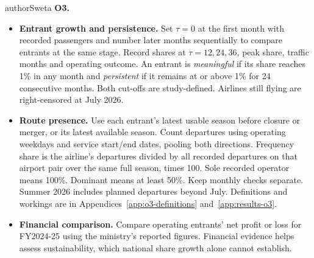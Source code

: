 \begin{authorcontribution}{authorSweta}
\label{sec:method-o3}
\textbf{O3.}
\begin{itemize}[leftmargin=2em]
    \item \textbf{Entrant growth and persistence.} Set $\tau=0$ at the first month with recorded passengers and number later months sequentially to compare entrants at the same stage. Record shares at $\tau=12,24,36$, peak share, traffic months and operating outcome. An entrant is \emph{meaningful} if its share reaches 1\% in any month and \emph{persistent} if it remains at or above 1\% for 24 consecutive months. Both cut-offs are study-defined. Airlines still flying are right-censored at July 2026.
    \item \textbf{Route presence.} Use each entrant's latest usable season before closure or merger, or its latest available season. Count departures using operating weekdays and service start/end dates, pooling both directions. Frequency share is the airline's departures divided by all recorded departures on that airport pair over the same full season, times 100. Sole recorded operator means 100\%. Dominant means at least 50\%. Keep monthly checks separate. Summer 2026 includes planned departures beyond July. Definitions and workings are in Appendices~\ref{app:o3-definitions} and~\ref{app:results-o3}.
    \item \textbf{Financial comparison.} Compare operating entrants' net profit or loss for FY2024-25 using the ministry's reported figures. Financial evidence helps assess sustainability, which national share growth alone cannot establish.
\end{itemize}
\end{authorcontribution}
